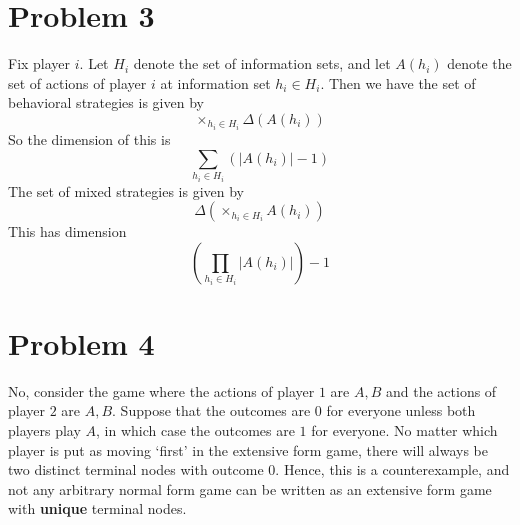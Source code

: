 \documentclass[10pt,letter]{article}
\begin{document}
\section*{Problem 3}
Fix player $i$. Let $H_i$ denote the set of information sets, and let $A(h_i)$ denote the set of actions of player $i$ at information set $h_i \in H_i$. Then we have the set of behavioral strategies is given by
\[ \times_{h_i \in H_i} \Delta\left(A(h_i)\right)  \]
So the dimension of this is
\[ \sum_{h_i \in H_i} \left(|A(h_i)| - 1\right) \]
The set of mixed strategies is given by
\[ \Delta \left( \times_{h_i \in H_i} A(h_i) \right) \]
This has dimension
\[ \left( \prod_{h_i \in H_i} |A(h_i)| \right) - 1 \]
\section*{Problem 4}
No, consider the game where the actions of player $1$ are $A,B$ and the actions of player $2$ are $A,B$. Suppose that the outcomes are $0$ for everyone unless both players play $A$, in which case the outcomes are $1$ for everyone. No matter which player is put as moving `first' in the extensive form game, there will always be two distinct terminal nodes with outcome 0. Hence, this is a counterexample, and not any arbitrary normal form game can be written as an extensive form game with \textbf{unique} terminal nodes. 
\end{document}
